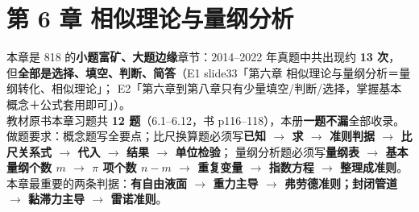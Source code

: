 \chapter*{第 6 章 相似理论与量纲分析}

\begin{tishi}
本章是 818 的\textbf{小题富矿、大题边缘}章节：2014--2022 年真题中共出现约 \textbf{13 次}，
但\textbf{全部是选择、填空、判断、简答}（E1 slide33「第六章 相似理论与量纲分析＝量纲转化、相似理论」；
E2「第六章到第八章只有少量填空/判断/选择，掌握基本概念＋公式套用即可」）。\\
教材原书本章习题共 \textbf{12 题}（6.1--6.12，书 p116--118），本册\textbf{一题不漏}全部收录。\\
做题要求：概念题写全要点；比尺换算题必须写\textbf{已知 $\to$ 求 $\to$ 准则判据 $\to$ 比尺关系式 $\to$ 代入 $\to$ 结果 $\to$ 单位检验}；
量纲分析题必须写\textbf{量纲表 $\to$ 基本量纲个数 $m$ $\to$ $\pi$ 项个数 $n-m$ $\to$ 重复变量 $\to$ 指数方程 $\to$ 整理成准则}。\\
本章最重要的两条判据：\textbf{有自由液面 $\to$ 重力主导 $\to$ 弗劳德准则；封闭管道 $\to$ 黏滞力主导 $\to$ 雷诺准则}。
\end{tishi}

